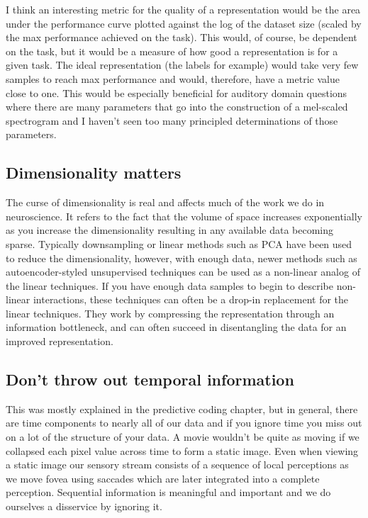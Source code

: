 I think an interesting metric for the quality of a representation would be the area under the performance curve plotted against the log of the dataset size (scaled by the max performance achieved on the task). This would, of course, be dependent on the task, but it would be a measure of how good a representation is for a given task. The ideal representation (the labels for example) would take very few samples to reach max performance and would, therefore, have a metric value close to one. This would be especially beneficial for auditory domain questions where there are many parameters that go into the construction of a mel-scaled spectrogram and I haven't seen too many principled determinations of those parameters.

\subsection{Dimensionality matters}
The curse of dimensionality is real and affects much of the work we do in neuroscience. It refers to the fact that the volume of space increases exponentially as you increase the dimensionality resulting in any available data becoming sparse. Typically downsampling or linear methods such as PCA have been used to reduce the dimensionality, however, with enough data, newer methods such as autoencoder-styled unsupervised techniques can be used as a non-linear analog of the linear techniques. If you have enough data samples to begin to describe non-linear interactions, these techniques can often be a drop-in replacement for the linear techniques. They work by compressing the representation through an information bottleneck, and can often succeed in disentangling the data for an improved representation.

\subsection{Don't throw out temporal information}
This was mostly explained in the predictive coding chapter, but in general, there are time components to nearly all of our data and if you ignore time you miss out on a lot of the structure of your data. A movie wouldn't be quite as moving if we collapsed each pixel value across time to form a static image. Even when viewing a static image our sensory stream consists of a sequence of local perceptions as we move fovea using saccades which are later integrated into a complete perception. Sequential information is meaningful and important and we do ourselves a disservice by ignoring it.


